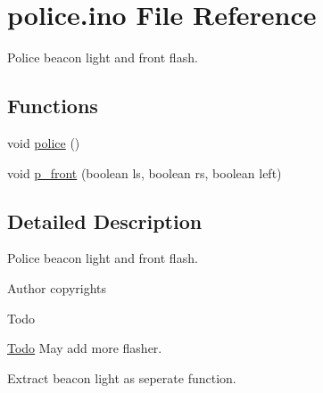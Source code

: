 \hypertarget{police_8ino}{}\section{police.\+ino File Reference}
\label{police_8ino}


Police beacon light and front flash.  


\subsection*{Functions}
{\bf }\par
\begin{DoxyCompactItemize}
\item 
void \hyperlink{group__police_ga55d627c45708bc26866e27d49432eee9}{police} ()
\item 
void \hyperlink{group__police_ga82542db5e1a84d584a1725f36caaf71e}{p\+\_\+front} (boolean ls, boolean rs, boolean left)
\end{DoxyCompactItemize}



\subsection{Detailed Description}
Police beacon light and front flash. 

\begin{DoxyAuthor}{Author}
copyrights 
\end{DoxyAuthor}
\begin{DoxyRefDesc}{Todo}
\item[\hyperlink{todo__todo000003}{Todo}]May add more flasher. 

Extract beacon light as seperate function. \end{DoxyRefDesc}
